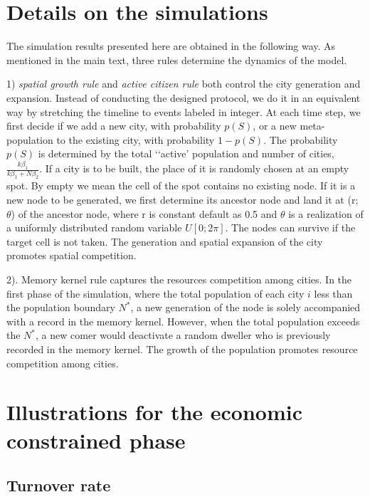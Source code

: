 \documentclass[aps,prl]{revtex4-2}
\begin{document}
\section{Details on the simulations}

The simulation results presented here are obtained in the following way. As mentioned in the main text, three rules determine the dynamics of the model.

1) \textit{spatial growth rule} and \textit{active citizen rule} both control the city generation and expansion. Instead of conducting the designed protocol, we do it in an equivalent way by stretching the timeline to events labeled in integer. At each time step, we first decide if we add a new city, with probability $p(S)$, or a new meta-population to the existing city, with probability $1 - p(S)$. The probability $p(S)$ is determined by the total ‘‘active’ population and number of cities, $\frac{k\beta_1}{k\beta_1+N\beta_2}$. If a city is to be built, the place of it is randomly chosen at an empty spot. By empty we mean the cell of the spot contains no existing node. If it is a new node to be generated, we first determine its ancestor node and land it at (r; $\theta$) of the ancestor node, where r is constant default as 0.5 and $\theta$ is a realization of a uniformly distributed random variable $U[0; 2\pi]$. The nodes can survive if the target cell is not taken. The generation and spatial expansion of the city promotes spatial competition. 

2). Memory kernel rule captures the resources competition among cities. In the first phase of the simulation, where the total population of each city $i$  less than the population boundary $N^*$,  a new generation of the node is solely accompanied with a record in the memory kernel. However,  when the total population exceeds the $N^*$, a new comer would deactivate a random dweller who is previously recorded in the memory kernel. The growth of the population promotes resource competition among cities.

\section{Illustrations for the economic constrained phase}

\subsection{Turnover rate} 
\end{document}

